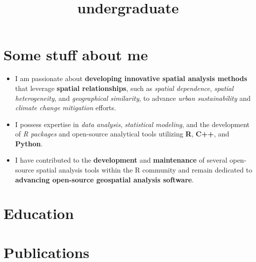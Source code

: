 \documentclass[11pt,a4paper,]{moderncv}
\title{undergraduate}
\providecommand{\tightlist}{%
	\setlength{\itemsep}{0pt}\setlength{\parskip}{0pt}}
\begin{document}
\makecvtitle



\section{Some stuff about me}\label{some-stuff-about-me}

\begin{itemize}
\tightlist
\item
  I am passionate about \textbf{developing innovative spatial analysis
  methods} that leverage \textbf{spatial relationships}, such as
  \emph{spatial dependence}, \emph{spatial heterogeneity}, and
  \emph{geographical similarity}, to advance \emph{urban sustainability}
  and \emph{climate change mitigation} efforts.
\item
  I possess expertise in \emph{data analysis}, \emph{statistical
  modeling}, and the development of \emph{R packages} and open-source
  analytical tools utilizing \textbf{R}, \textbf{C++}, and
  \textbf{Python}.
\item
  I have contributed to the \textbf{development} and
  \textbf{maintenance} of several open-source spatial analysis tools
  within the R community and remain dedicated to \textbf{advancing
  open-source geospatial analysis software}.
\end{itemize}

\section{Education}\label{education}

\nopagebreak

\section{Publications}\label{publications}
\end{document}
